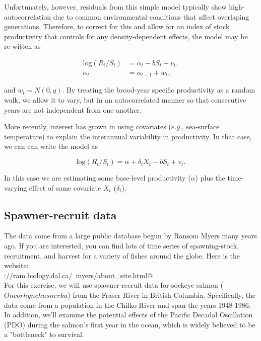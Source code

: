Unfortunately, however, residuals from this simple model typically show high-autocorrelation due to common environmental conditions that affect overlaping generations.  Therefore, to correct for this and allow for an index of stock productivity that controls for any density-dependent effects, the model may be re-witten as

\begin{equation}\label{eqn:lnTVRicker}
\begin{aligned}
\text{log}(R_t/S_t) &= \alpha_t - b S_t + v_t, \\
\alpha_t &= \alpha_{t-1} + w_t,
\end{aligned}
\end{equation}

\noindent and $w_t \sim N(0,q)$.  By treating the brood-year specific productivity as a random walk, we allow it to vary, but in an autocorrelated manner so that consecutive years are not independent from one another.

More recently, interest has grown in using covariates ($e.g.$, sea-surface temperature) to explain the interannual variability in productivity.  In that case, we can can write the model as

\begin{equation}\label{eqn:lnCovRicker}
\text{log}(R_t/S_t) = \alpha + \delta_t X_t - b S_t + v_t.
\end{equation}

\noindent In this case we are estimating some base-level productivity ($\alpha$) plus the time-varying effect of some covariate $X_t$ ($\delta_t$). 


\subsection{Spawner-recruit data}

The data come from a large public database begun by Ransom Myers many years ago.  If you are interested, you can find lots of time series of spawning-stock, recruitment, and harvest for a variety of fishes around the globe.  Here is the website:\\

\verb@http://ram.biology.dal.ca/~myers/about_site.html@\\

For this exercise, we will use spawner-recruit data for sockeye salmon ($Oncorhynchus nerka$) from the Fraser River in British Columbia. Specifically, the data come from a population in the Chilko River and span the years 1948-1986.  In addition, we'll examine the potential effects of the Pacific Decadal Oscillation (PDO) during the salmon's first year in the ocean, which is widely believed to be a "bottleneck" to survival.

